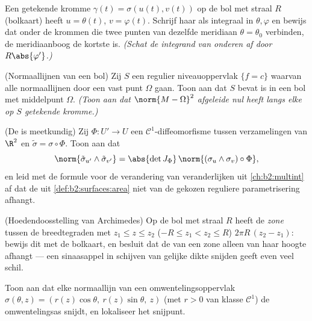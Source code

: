 \begin{exercise}[$\star\star$]\label{exo:b2:surfaces:6}
Een getekende kromme $\gamma(t) = \sigma(u(t), v(t))$ op de bol met
straal $R$ (bolkaart) heeft $u = \theta(t)$, $v = \varphi(t)$.
Schrijf haar  als integraal in $\theta, \varphi$ en bewijs
dat onder de krommen die twee punten van dezelfde meridiaan $\theta
= \theta_0$ verbinden, de meridiaanboog de kortste is. \emph{(Schat
de integrand van onderen af door $R\abs{\varphi'}$.)}
\end{exercise}

\begin{exercise}[$\star\star\star$]\label{exo:b2:surfaces:7}
(Normaallijnen van een bol) Zij $S$ een regulier 
niveauoppervlak $\{f = c\}$ waarvan alle normaallijnen door een
vast punt $\Omega$ gaan. Toon aan dat $S$ bevat is in een bol met
middelpunt $\Omega$. \emph{(Toon aan dat $\norm{M - \Omega}^2$
afgeleide nul heeft langs elke op $S$ getekende kromme.)}
\end{exercise}

\begin{exercise}[$\star\star\star$]\label{exo:b2:surfaces:8}
(De  is meetkundig) Zij $\Phi \colon U' \to U$ een
$\mathcal{C}^1$-diffeomorfisme tussen  verzamelingen van $\R^2$
en $\tilde\sigma = \sigma \circ \Phi$. Toon aan dat
\[
\norm{\tilde\sigma_{u'} \wedge \tilde\sigma_{v'}}
= \abs{\det J_\Phi}\,
\norm{(\sigma_u \wedge \sigma_v)\circ\Phi} ,
\]
en leid met de formule voor de verandering van veranderlijken uit
\cref{ch:b2:multint} af dat de  uit
\cref{def:b2:surfaces:area} niet van de gekozen reguliere
parametrisering afhangt.
\end{exercise}

\begin{exercise}[$\star$]\label{exo:b2:surfaces:9}
(Hoedendoosstelling van Archimedes) Op de bol met straal $R$ heeft
de \emph{zone} tussen de breedtegraden met $z_1 \leq z \leq z_2$
($-R \leq z_1 < z_2 \leq R$)  $2\pi R\,(z_2 - z_1)$:
bewijs dit met de bolkaart, en besluit dat de  van een
zone alleen van haar hoogte afhangt --- een sinaasappel in
schijven van gelijke dikte snijden geeft even veel schil.
\end{exercise}

\begin{exercise}[$\star\star$]\label{exo:b2:surfaces:10}
Toon aan dat elke normaallijn van een omwentelingsoppervlak
$\sigma(\theta, z) = (r(z)\cos\theta,\ r(z)\sin\theta,\ z)$ (met $r
> 0$ van klasse $\mathcal C^1$) de omwentelingsas snijdt, en
lokaliseer het snijpunt.
\end{exercise}

